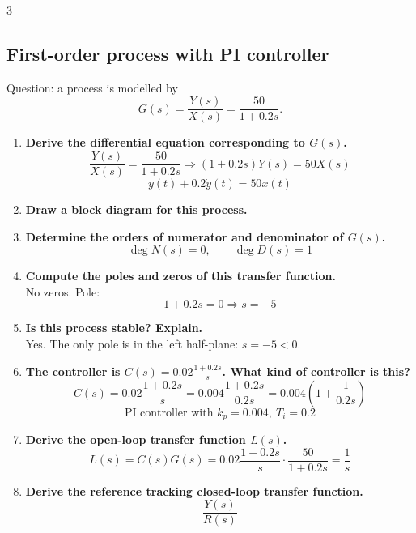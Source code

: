\documentclass[9pt, landscape, a4paper]{article}
\begin{document}
\begin{multicols*}{3}
\subsection{First-order process with PI controller}
Question: a process is modelled by
\[
    G(s)=\frac{Y(s)}{X(s)}=\frac{50}{1+0.2s}.
\]
\begin{enumerate}[label=\alph*.]
    \item \textbf{Derive the differential equation corresponding to $G(s)$.}
    \[
        \frac{Y(s)}{X(s)}=\frac{50}{1+0.2s}
        \Rightarrow (1+0.2s)Y(s)=50X(s)
    \]
    \[
        \boxed{y(t)+0.2\dot{y}(t)=50x(t)}
    \]
    \item \textbf{Draw a block diagram for this process.}
    \begin{center}
    \end{center}
    \item \textbf{Determine the orders of numerator and denominator of $G(s)$.}
    \[
        \boxed{\deg N(s)=0,\qquad \deg D(s)=1}
    \]
    \item \textbf{Compute the poles and zeros of this transfer function.}\\
    No zeros. Pole:
    \[
        1+0.2s=0 \Rightarrow \boxed{s=-5}
    \]
    \item \textbf{Is this process stable? Explain.}\\
    Yes. The only pole is in the left half-plane: $s=-5<0$.
    \item \textbf{The controller is
    $C(s)=0.02\frac{1+0.2s}{s}$. What kind of controller is this?}
    \[
        C(s)=0.02\frac{1+0.2s}{s}
        =0.004\frac{1+0.2s}{0.2s}
        =0.004\left(1+\frac{1}{0.2s}\right)
    \]
    \[
        \boxed{\text{PI controller with }k_p=0.004,\ T_i=0.2}
    \]
    \item \textbf{Derive the open-loop transfer function $L(s)$.}
    \[
        L(s)=C(s)G(s)
        =0.02\frac{1+0.2s}{s}\cdot\frac{50}{1+0.2s}
        =\boxed{\frac{1}{s}}
    \]
    \item \textbf{Derive the reference tracking closed-loop transfer function.}
    \[
        \boxed{\frac{Y(s)}{R(s)}
}\]
\end{enumerate}
\end{multicols*}
\end{document}

